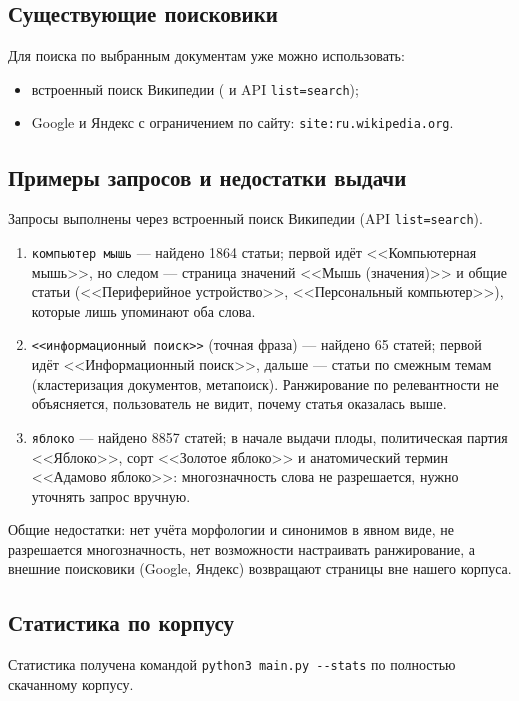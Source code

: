 \subsection{Существующие поисковики}
Для поиска по выбранным документам уже можно использовать:
\begin{itemize}
    \item встроенный поиск Википедии
    (
    и API \texttt{list=search});
    \item Google и Яндекс с ограничением по сайту:
    \texttt{site:ru.wikipedia.org}.
\end{itemize}

\subsection{Примеры запросов и недостатки выдачи}
Запросы выполнены через встроенный поиск Википедии (API \texttt{list=search}).
\begin{enumerate}
    \item \texttt{компьютер мышь} --- найдено 1864 статьи; первой идёт
    <<Компьютерная мышь>>, но следом --- страница значений <<Мышь (значения)>> и
    общие статьи (<<Периферийное устройство>>, <<Персональный компьютер>>), которые
    лишь упоминают оба слова.
    \item \texttt{<<информационный поиск>>} (точная фраза) --- найдено 65
    статей; первой идёт <<Информационный поиск>>, дальше --- статьи по смежным
    темам (кластеризация документов, метапоиск). Ранжирование по релевантности
    не объясняется, пользователь не видит, почему статья оказалась выше.
    \item \texttt{яблоко} --- найдено 8857 статей; в начале выдачи плоды,
    политическая партия <<Яблоко>>, сорт <<Золотое яблоко>> и анатомический
    термин <<Адамово яблоко>>: многозначность слова не разрешается, нужно
    уточнять запрос вручную.
\end{enumerate}

Общие недостатки: нет учёта морфологии и синонимов в явном виде, не разрешается
многозначность, нет возможности настраивать ранжирование, а внешние поисковики
(Google, Яндекс) возвращают страницы вне нашего корпуса.

\subsection{Статистика по корпусу}
Статистика получена командой \texttt{python3 main.py -{}-stats} по полностью
скачанному корпусу.

